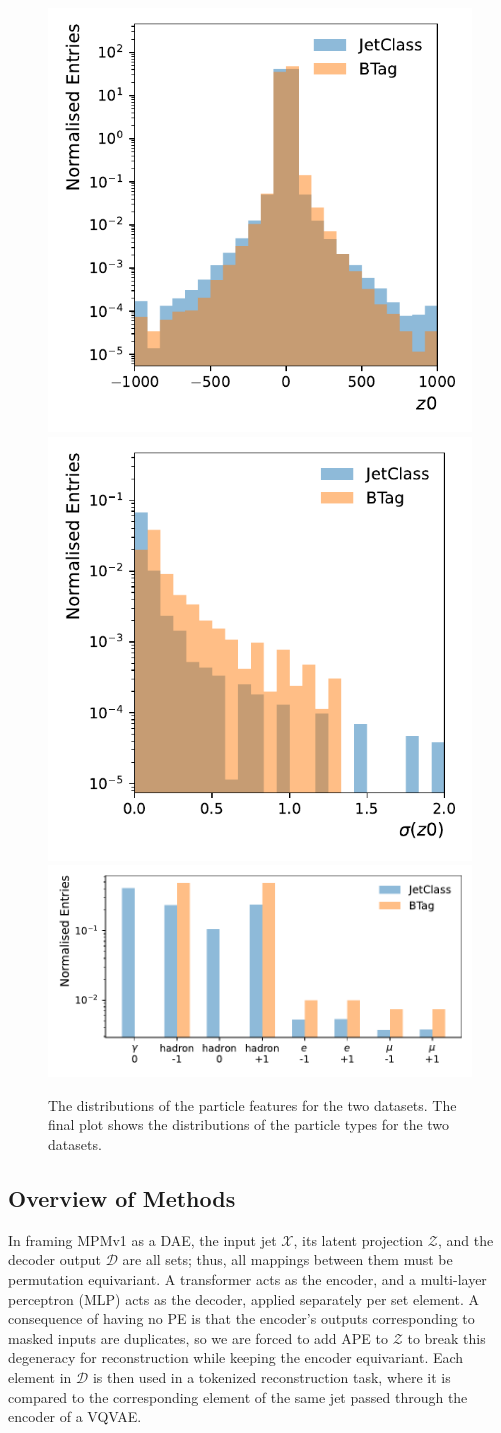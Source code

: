 \begin{figure}[h]
    \includegraphics[width=0.32\linewidth]{Figures/foundation_models/mpm2/data/dzval.pdf}
    \includegraphics[width=0.32\linewidth]{Figures/foundation_models/mpm2/data/dzerr.pdf}
    \includegraphics[width=0.64\linewidth]{Figures/foundation_models/mpm2/data/csts_id.pdf}
    \caption{The distributions of the particle features for the two datasets. The final plot shows the distributions of the particle types \xid for the two datasets.}
    \label{fig:mpm2_features}
\end{figure}

\subsection{Overview of Methods}

In framing MPMv1 as a DAE, the input jet $\mathcal{X}$, its latent projection $\mathcal{Z}$, and the decoder output $\mathcal{D}$ are all sets; thus, all mappings between them must be permutation equivariant.
A transformer acts as the encoder, and a multi-layer perceptron (MLP) acts as the decoder, applied separately per set element.
A consequence of having no PE is that the encoder's outputs corresponding to masked inputs are duplicates, so we are forced to add APE to $\mathcal{Z}$ to break this degeneracy for reconstruction while keeping the encoder equivariant.
Each element in $\mathcal{D}$ is then used in a tokenized reconstruction task, where it is compared to the corresponding element of the same jet passed through the encoder of a VQVAE.

